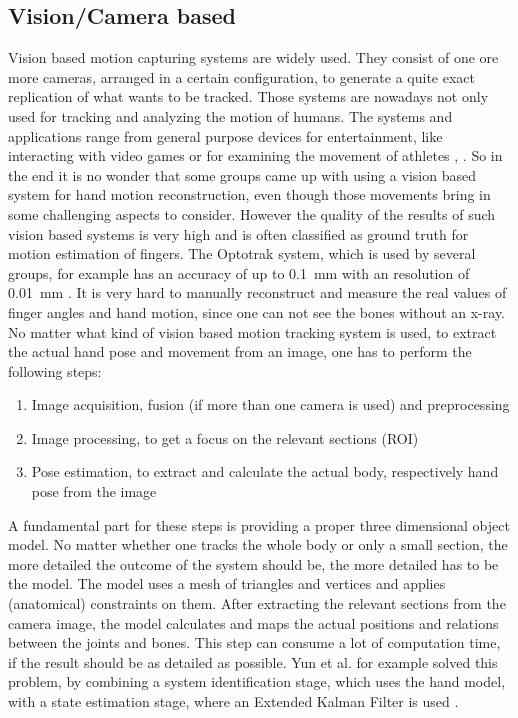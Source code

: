 \subsection{Vision/Camera based} \label{subsec:approaches:vision}
Vision based motion capturing systems are widely used. They consist of one ore more cameras, arranged in a certain configuration, to generate a quite exact replication of what wants to be tracked. Those systems are nowadays not only used for tracking and analyzing the motion of humans. The systems and applications range from general purpose devices for entertainment, like interacting with video games or for examining the movement of athletes \cite{zhang2012microsoft}, \cite{boyd2012situ}. So in the end it is no wonder that some groups came up with using a vision based system for hand motion reconstruction, even though those movements bring in some challenging aspects to consider. However the quality of the results of such vision based systems is very high and is often classified as ground truth for motion estimation of fingers. The Optotrak system, which is used by several groups, for example has an accuracy of up to \SI{0.1}{\mm} with an resolution of \SI{0.01}{\mm} \cite{optotrak}. It is very hard to manually reconstruct and measure the real values of finger angles and hand motion, since one can not see the bones without an x-ray. \\
No matter what kind of vision based motion tracking system is used, to extract the actual hand pose and movement from an image, one has to perform the following steps:
\begin{enumerate}
\item Image acquisition, fusion (if more than one camera is used) and preprocessing
\item Image processing, to get a focus on the relevant sections (\ac{ROI}) 
\item Pose estimation, to extract and calculate the actual body, respectively hand pose from the image
\end{enumerate}
A fundamental part for these steps is providing a proper three dimensional object model. No matter whether one tracks the whole body or only a small section, the more detailed the outcome of the system should be, the more detailed has to be the model. The model uses a mesh of triangles and vertices and applies (anatomical) constraints on them. After extracting the relevant sections from the camera image, the model calculates and maps the actual positions and relations between the joints and bones. This step can consume a lot of computation time, if the result should be as detailed as possible. Yun et al. for example solved this problem, by combining a system identification stage, which uses the hand model, with a state estimation stage, where an Extended Kalman Filter is used \cite{yun2013accurate}.


